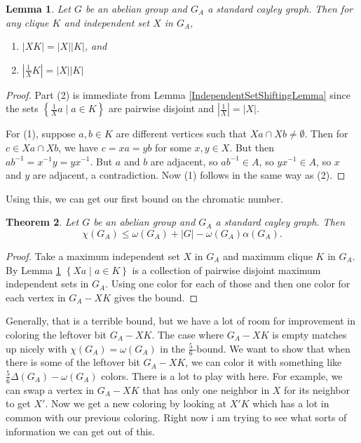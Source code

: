 \documentclass[12pt]{article}
\theoremstyle{plain}
\newtheorem{thm}{Theorem}[section]
\newtheorem{lem}[thm]{Lemma}
\theoremstyle{definition}
\theoremstyle{remark}
\newcommand{\setbs}[2]{\left\{ #1 \mid #2 \right\}}
\newcommand{\card}[1]{\left|#1\right|}
\begin{document}
\begin{lem}\label{IndependentSetShiftingLemmaAbelian}
Let $G$ be an abelian group and $G_A$ a standard cayley graph.   Then for any clique $K$ and independent set $X$ in $G_A$,
\begin{enumerate}
\item $\card{XK} = \card{X}\card{K}$, and\\
\item $\card{\frac{1}{X}K} = \card{X}\card{K}$
\end{enumerate}
\end{lem}
\begin{proof}
Part (2) is immediate from Lemma \ref{IndependentSetShiftingLemma} since the sets $\setbs{\frac{1}{X}a}{a \in K}$ are pairwise disjoint and $\card{\frac{1}{X}} = \card{X}$.

For (1), suppose $a,b \in K$ are different vertices such that $Xa \cap Xb \ne \emptyset$.  Then for $c \in Xa \cap Xb$, we have $c = xa = yb$ for some $x,y \in X$.  But then
$ab^{-1} = x^{-1}y = yx^{-1}$.  But $a$ and $b$ are adjacent, so $ab^{-1} \in A$, so $yx^{-1} \in A$, so $x$ and $y$ are adjacent, a contradiction.  Now (1) follows in the same way as (2).
\end{proof}
Using this, we can get our first bound on the chromatic number.
\begin{thm}\label{OmegaTilingColoring}
Let $G$ be an abelian group and $G_A$ a standard cayley graph.  Then 
\[\chi(G_A) \le \omega(G_A) + |G| - \omega(G_A)\alpha(G_A).\]
\end{thm}
\begin{proof}
Take a maximum independent set $X$ in $G_A$ and maximum clique $K$ in $G_A$.  By Lemma \ref{IndependentSetShiftingLemmaAbelian} $\setbs{Xa}{a \in K}$ is 
a collection of pairwise disjoint maximum independent sets in $G_A$.  Using one color for each of those and then one color for each vertex in $G_A - XK$ gives the bound.
\end{proof}

Generally, that is a terrible bound, but we have a lot of room for improvement in coloring the leftover bit $G_A - XK$.  The case where $G_A - XK$ is empty matches up nicely
with $\chi(G_A) = \omega(G_A)$ in the $\frac56$-bound.  We want to show that when there is some of the leftover bit $G_A - XK$, we can color it with something like $\frac56\Delta(G_A) - \omega(G_A)$ colors.
There is a lot to play with here. For example, we can swap a vertex in $G_A - XK$ that has only one neighbor in $X$ for its neighbor to get $X'$.  Now we get a new coloring by looking at $X'K$ which has a lot in common
with our previous coloring.  Right now i am trying to see what sorts of information we can get out of this.
\end{document}
